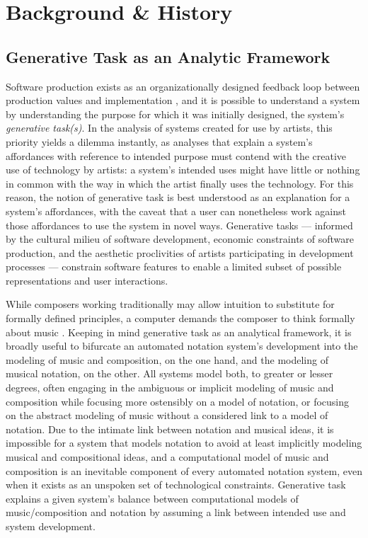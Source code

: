 \section{Background \& History}\label{sec:background}

\subsection{Generative Task as an Analytic Framework}
Software production exists as an organizationally designed feedback loop between production values and implementation \cite{Derniame:1999fk}, and it is possible to understand a system by understanding the purpose for which it was initially designed, the system's \emph{generative task(s)}. In the analysis of systems created for use by artists, this priority yields a dilemma instantly, as analyses that explain a system's affordances with reference to intended purpose must contend with the creative use of technology by artists: a system's intended uses might have little or nothing in common with the way in which the artist finally uses the technology. For this reason, the notion of generative task is best understood as an explanation for a system's affordances, with the caveat that a user can nonetheless work against those affordances to use the system in novel ways. Generative tasks --- informed by the cultural milieu of software development, economic constraints of software production, and the aesthetic proclivities of artists participating in development processes --- constrain software features to enable a limited subset of possible representations and user interactions.

While composers working traditionally may allow intuition to substitute for formally defined principles, a computer demands the composer to think formally about music \cite{Xenakis:1992rq}. Keeping in mind generative task as an analytical framework, it is broadly useful to bifurcate an automated notation system's development into the modeling of music and composition, on the one hand, and the modeling of musical notation, on the other. All systems model both, to greater or lesser degrees, often engaging in the ambiguous or implicit modeling of music and composition while focusing more ostensibly on a model of notation, or focusing on the abstract modeling of music without a considered link to a model of notation. Due to the intimate link between notation and musical ideas, it is impossible for a system that models notation to avoid at least implicitly modeling musical and compositional ideas, and a computational model of music and composition is an inevitable component of every automated notation system, even when it exists as an unspoken set of technological constraints. Generative task explains a given system's balance between computational models of music/composition and notation by assuming a link between intended use and system development.

